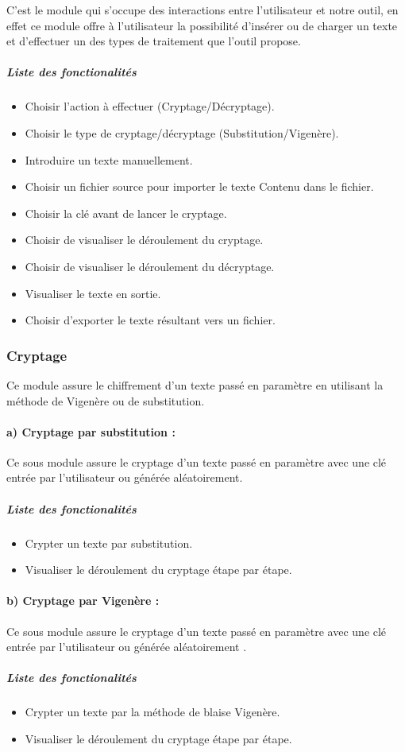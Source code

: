 \documentclass[11pt]{article}
\begin{document}
C'est le module qui s’occupe des interactions entre l’utilisateur et notre outil, en effet ce module offre à l’utilisateur la possibilité d’insérer ou de charger un texte et d’effectuer un des types de traitement que l’outil propose.
\subparagraph{Liste des fonctionalités}
\begin{itemize}[label=\textbullet]
    \item Choisir l’action à effectuer (Cryptage/Décryptage).
    \item Choisir le type de cryptage/décryptage (Substitution/Vigenère).
    \item Introduire un texte manuellement.
    \item Choisir un fichier source pour importer le texte Contenu dans le fichier.
    \item Choisir la clé avant de lancer le cryptage.
    \item Choisir de visualiser le déroulement du cryptage.
    \item Choisir de visualiser le déroulement du décryptage.
    \item Visualiser le texte en sortie.
    \item Choisir d’exporter le texte résultant vers un fichier.
\end{itemize}

\subsubsection{Cryptage}
Ce module assure le chiffrement d’un texte passé en paramètre en utilisant la méthode de Vigenère ou de substitution.

\paragraph{a) Cryptage par substitution :}
\newline
Ce sous module assure le cryptage d’un texte passé en paramètre avec une clé entrée par l’utilisateur ou générée aléatoirement.
\subparagraph{Liste des fonctionalités}
\begin{itemize}[label=\textbullet]
   \item Crypter un texte par substitution.
   \item Visualiser le déroulement du cryptage étape par étape.
\end{itemize}

\paragraph{b) Cryptage par Vigenère :}
\newline
Ce sous module assure le cryptage d’un texte passé en paramètre avec une clé entrée par l’utilisateur ou générée aléatoirement .
\subparagraph{Liste des fonctionalités}
\begin{itemize}[label=\textbullet]
   \item Crypter un texte par la méthode de blaise Vigenère.
   \item Visualiser le déroulement du cryptage étape par étape.
\end{itemize}
\end{document}
